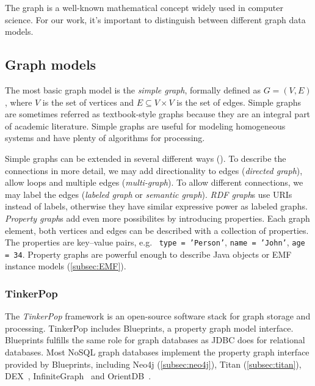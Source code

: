 The graph is a well-known mathematical concept widely used in computer science. For our work, it's important to distinguish between different graph data models.


\subsection{Graph models}

The most basic graph model is the \emph{simple graph}, formally defined as $G = (V, E)$, where $V$ is the set of vertices and $E \subseteq V \times V$ is the set of edges. Simple graphs are sometimes referred as textbook-style graphs because they are an integral part of academic literature. Simple graphs are useful for modeling homogeneous systems and have plenty of algorithms for processing.

Simple graphs can be extended in several different ways (). To describe the connections in more detail, we may add directionality to edges (\emph{directed graph}), allow loops and multiple edges (\emph{multi-graph}). To allow different connections, we may label the edges (\emph{labeled graph} or \emph{semantic graph}). \emph{RDF graph}s use URIs instead of labels, otherwise they have similar expressive power as labeled graphs. \emph{Property graph}s add even more possibilites by introducing properties. Each graph element, both vertices and edges can be described with a collection of properties. The properties are key--value pairs, e.g.\ %
\texttt{type = 'Person'}, \texttt{name = 'John'}, \texttt{age = 34}. 
Property graphs are powerful enough to describe Java objects or EMF instance models (\autoref{subsec:EMF}).

\subsubsection{TinkerPop}

The \textit{TinkerPop} framework is an open-source software stack for graph storage and processing. TinkerPop includes Blueprints, a property graph model interface. Blueprints fulfills the same role for graph databases as JDBC does for relational databases. Most NoSQL graph databases implement the property graph interface provided by Blueprints, including Neo4j (\autoref{subsec:neo4j}), Titan (\autoref{subsec:titan}), DEX~\cite{DEX}, InfiniteGraph~\cite{InfiniteGraph} and OrientDB~\cite{OrientDB}.

